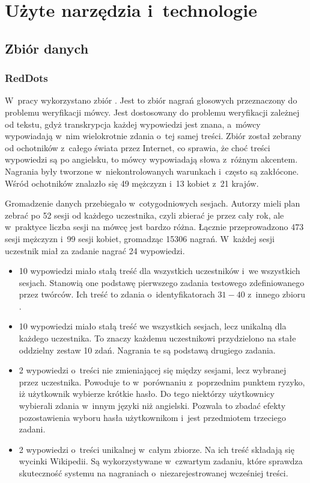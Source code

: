 \chapter{Użyte narzędzia i~technologie}\label{chap:technologie}

\section{Zbiór danych}\label{sec:zbior_danych}

\subsection{RedDots}

W~pracy wykorzystano zbiór \cite{theReddotsDataCollection}.
Jest to zbiór nagrań głosowych przeznaczony do problemu weryfikacji mówcy.
Jest dostosowany do problemu weryfikacji zależnej od tekstu, gdyż transkrypcja każdej wypowiedzi jest znana,
a~mówcy wypowiadają w~nim wielokrotnie zdania o~tej samej treści. Zbiór został zebrany od ochotników z~całego
świata przez Internet, co sprawia, że choć treści wypowiedzi są po angielsku, to mówcy wypowiadają słowa
z~różnym akcentem. Nagrania były tworzone w~niekontrolowanych warunkach i~często są zakłócone.
Wśród ochotników znalazło się 49 mężczyzn i~13 kobiet z~21 krajów.

Gromadzenie danych przebiegało w~cotygodniowych sesjach. Autorzy mieli plan zebrać po 52 sesji od każdego uczestnika,
czyli zbierać je przez cały rok, ale w~praktyce liczba sesji na mówcę jest bardzo różna. Łącznie przeprowadzono
473 sesji mężczyzn i~99 sesji kobiet, gromadząc 15306 nagrań. W~każdej sesji uczestnik miał za zadanie nagrać 24 wypowiedzi.

\begin{itemize}
    \item 10 wypowiedzi miało stałą treść dla wszystkich uczestników i~we wszystkich sesjach. Stanowią one podstawę
        pierwszego zadania testowego zdefiniowanego przez twórców. Ich treść to zdania o~identyfikatorach $31-40$
        z~innego zbioru \cite{darpaTimitAcoustic}.
    \item 10 wypowiedzi miało stałą treść we wszystkich sesjach, lecz unikalną dla każdego uczestnika. To znaczy
        każdemu uczestnikowi przydzielono na stałe oddzielny zestaw 10 zdań. Nagrania te są podstawą drugiego zadania.
    \item 2 wypowiedzi o~treści nie zmieniającej się między sesjami, lecz wybranej przez uczestnika. Powoduje
        to w~porównaniu z~poprzednim punktem ryzyko, iż użytkownik wybierze krótkie hasło. Do tego niektórzy
        użytkownicy wybierali zdania w~innym języki niż angielski. Pozwala to zbadać efekty pozostawienia wyboru hasła
        użytkownikom i~jest przedmiotem trzeciego zadani.
    \item 2 wypowiedzi o~treści unikalnej w~całym zbiorze. Na ich treść składają się wycinki Wikipedii. Są wykorzystywane
        w~czwartym zadaniu, które sprawdza skuteczność systemu na nagraniach o~niezarejestrowanej wcześniej treści.
\end{itemize}

